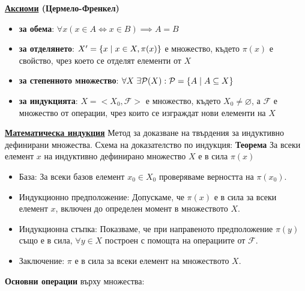 \documentclass{article}
\begin{document}
\textbf{\underline{Аксиоми} (Цермело-Френкел)}
\begin{itemize}
    \item \textbf{за обема}: $\forall x (x \in A \iff x \in B) \implies A = B$
    \item \textbf{за отделянето}: $X' = \{x \hspace{0.1cm} | \hspace{0.1cm} x \in X, \pi(x)\}$ е множество, където $\pi(x)$ е свойство, чрез което се отделят елементи от $X$
    \item \textbf{за степенното множество}: $\forall X \hspace{0.1cm} \exists \mathcal{P}(X) : \mathcal{P} = \{A \hspace{0.1cm} | \hspace{0.1cm} A \subseteq X\}$
    \item \textbf{за индукцията}: $X = <X_0, \mathcal{F}>$ е множество, където $X_0 \neq \varnothing$, а $\mathcal{F}$ е
    множество от операции, чрез които се изграждат нови елементи на $X$
\end{itemize}
\textbf{\underline{Математическа индукция}} \newline
Метод за доказване на твърдения за индуктивно дефинирани множества. Схема на доказателство по индукция: \newline\newline
\textbf{Теорема}\newline
За всеки елемент $x$ на индуктивно дефинирано множество $X$ е в сила $\pi(x)$
    \begin{itemize}
        \item База: За всеки базов елемент $x_0 \in X_0$ проверяваме верността на $\pi(x_0)$.
        \item Индукционно предположение: Допускаме, че $\pi(x)$ е в сила за всеки елемент $x$, включен до определен
        момент в множеството $X$.
        \item Индукционна стъпка: Показваме, че при направеното предположение $\pi(y)$ също е в сила, $\forall y \in X$
        построен с помощта на операциите от $\mathcal{F}$.
        \item Заключение: $\pi$ е в сила за всеки елемент на множеството $X$.
    \end{itemize}
\textbf{Основни операции} върху множества:
\end{document}

